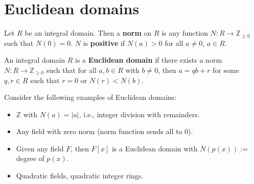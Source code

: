 \documentclass{article}
\theoremstyle{plain}
\newcommand{\Z}{\mathbb{Z}}
\begin{document}
\section{Euclidean domains}
\begin{definition}{}{}
Let $R$ be an integral domain. Then a \textbf{norm} on $R$ is any function $N : R \to \Z_{\ge 0}$ such that $N(0) = 0$. $N$ is \textbf{positive} if $N(a) > 0$ for all $a \ne 0$, $a \in R$.	
\end{definition}
\begin{definition}{}{}
An integral domain $R$ is a \textbf{Euclidean domain} if there exists a norm $N : R \to \Z_{\ge 0}$ such that for all $a,b \in R$ with $b \ne 0$, then $a=qb+r$ for some $q,r \in R$ such that $r = 0$ or $N(r) < N(b)$.	
\end{definition}
Consider the following examples of Euclidean domains:
\begin{itemize}
	\item $\Z$ with $N(a) = |a|$, i.e., integer division with remainders.
	\item Any field with zero norm (norm function sends all to $0$).
	\item Given any field $F$, then $F[x]$ is a Euclidean domain with $N(p(x)) :=$ degree of $p(x)$.
	\item Quadratic fields, quadratic integer rings.
\end{itemize}
\end{document}
